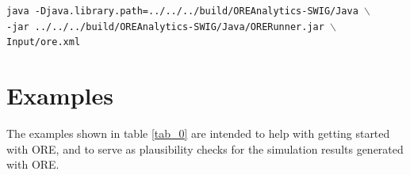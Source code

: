 \documentclass[12pt, a4paper]{article}
\begin{document}
{\begin{enumerate}
\medskip
{\tt java -Djava.library.path=../../../build/OREAnalytics-SWIG/Java $\backslash$} \\
\hspace{1cm} {\tt -jar ../../../build/OREAnalytics-SWIG/Java/ORERunner.jar $\backslash$}\\
\hspace{1cm} {\tt Input/ore.xml}

\end{enumerate}

\section{Examples}\label{sec:examples}

The examples shown in table \ref{tab_0} are intended to help with getting started with ORE, and to serve as plausibility
checks for the simulation results generated with ORE.

}
\end{document}
